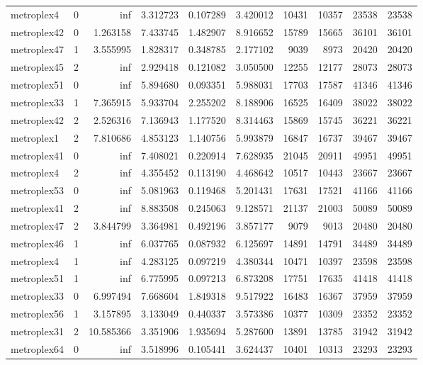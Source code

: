 \begin{longtable}{|l|r|r|r|r|r|r|r|r|r|}
metroplex4 & 0 & inf & 3.312723 & 0.107289 & 3.420012 & 10431 & 10357 & 23538 & 23538 \\
metroplex42 & 0 & 1.263158 & 7.433745 & 1.482907 & 8.916652 & 15789 & 15665 & 36101 & 36101 \\
metroplex47 & 1 & 3.555995 & 1.828317 & 0.348785 & 2.177102 & 9039 & 8973 & 20420 & 20420 \\
metroplex45 & 2 & inf & 2.929418 & 0.121082 & 3.050500 & 12255 & 12177 & 28073 & 28073 \\
metroplex51 & 0 & inf & 5.894680 & 0.093351 & 5.988031 & 17703 & 17587 & 41346 & 41346 \\
metroplex33 & 1 & 7.365915 & 5.933704 & 2.255202 & 8.188906 & 16525 & 16409 & 38022 & 38022 \\
metroplex42 & 2 & 2.526316 & 7.136943 & 1.177520 & 8.314463 & 15869 & 15745 & 36221 & 36221 \\
metroplex1 & 2 & 7.810686 & 4.853123 & 1.140756 & 5.993879 & 16847 & 16737 & 39467 & 39467 \\
metroplex41 & 0 & inf & 7.408021 & 0.220914 & 7.628935 & 21045 & 20911 & 49951 & 49951 \\
metroplex4 & 2 & inf & 4.355452 & 0.113190 & 4.468642 & 10517 & 10443 & 23667 & 23667 \\
metroplex53 & 0 & inf & 5.081963 & 0.119468 & 5.201431 & 17631 & 17521 & 41166 & 41166 \\
metroplex41 & 2 & inf & 8.883508 & 0.245063 & 9.128571 & 21137 & 21003 & 50089 & 50089 \\
metroplex47 & 2 & 3.844799 & 3.364981 & 0.492196 & 3.857177 & 9079 & 9013 & 20480 & 20480 \\
metroplex46 & 1 & inf & 6.037765 & 0.087932 & 6.125697 & 14891 & 14791 & 34489 & 34489 \\
metroplex4 & 1 & inf & 4.283125 & 0.097219 & 4.380344 & 10471 & 10397 & 23598 & 23598 \\
metroplex51 & 1 & inf & 6.775995 & 0.097213 & 6.873208 & 17751 & 17635 & 41418 & 41418 \\
metroplex33 & 0 & 6.997494 & 7.668604 & 1.849318 & 9.517922 & 16483 & 16367 & 37959 & 37959 \\
metroplex56 & 1 & 3.157895 & 3.133049 & 0.440337 & 3.573386 & 10377 & 10309 & 23352 & 23352 \\
metroplex31 & 2 & 10.585366 & 3.351906 & 1.935694 & 5.287600 & 13891 & 13785 & 31942 & 31942 \\
metroplex64 & 0 & inf & 3.518996 & 0.105441 & 3.624437 & 10401 & 10313 & 23293 & 23293 \\

\end{longtable}
